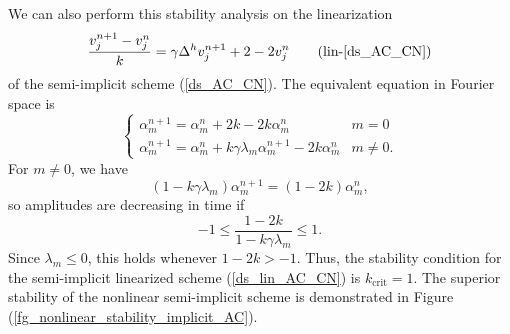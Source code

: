 \documentclass[12pt, reqno]{report}
\theoremstyle{definition}
\theoremstyle{remark}
\begin{document}
    
We can also perform this stability analysis on the linearization
\begin{equation}\label{ds_lin_AC_CN}
    \frac{v_{j}^{n+1}-v_{j}^{n}}{k}=\gamma \Delta^{h}v_{j}^{n+1}+2-2v_{j}^{n}\tag{lin-\ref{ds_AC_CN}}
\end{equation}
of the semi-implicit scheme (\ref{ds_AC_CN}).
The equivalent equation in Fourier space is
\begin{equation}
    \begin{cases}
        \alpha_{m}^{n+1}=\alpha_{m}^{n}+2k-2k \alpha_{m}^{n} & m=0 \\
        \alpha_{m}^{n+1}= \alpha_{m}^{n}+k \gamma \lambda_{m}\alpha_{m}^{n+1}-2k\alpha_{m}^{n} & m\ne0.
    \end{cases}
\end{equation}
For $m\ne0$, we have 
\begin{equation}
    (1-k \gamma \lambda_{m})\alpha_{m}^{n+1}=(1-2k)\alpha_{m}^{n},
\end{equation}
so amplitudes are decreasing in time if 
\begin{equation} 
    -1\le\frac{1-2k}{1-k \gamma \lambda_{m}}\le1.
\end{equation}
Since $\lambda_{m}\le0$, this holds whenever $1-2k>-1$. 
Thus, the stability condition for the semi-implicit linearized scheme (\ref{ds_lin_AC_CN}) is 
    $k_\text{crit}= 1.$
The superior stability of the nonlinear semi-implicit scheme is demonstrated in Figure (\ref{fg_nonlinear_stability_implicit_AC}).

\def\acfdwidth{.28\paperwidth}
\end{document}
